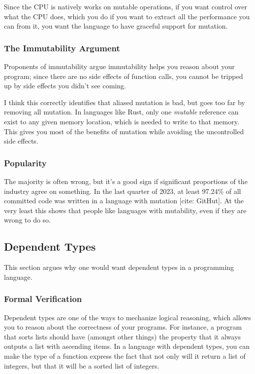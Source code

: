 \documentclass[12pt,twoside]{report}
\begin{document}
Since the CPU is natively works on mutable operations, if you want control over what the CPU does, which you do if you want to extract all the performance you can from it, you want the language to have graceful support for mutation.

\subsubsection{The Immutability Argument}
Proponents of immutability argue immutability helps you reason about your program; since there are no side effects of function calls, you cannot be tripped up by side effects you didn't see coming.

I think this correctly identifies that aliased mutation is bad, but goes too far by removing all mutation. In languages like Rust, only one \textit{mutable} reference can exist to any given memory location, which is needed to write to that memory. This gives you most of the benefits of mutation while avoiding the uncontrolled side effects.

\subsubsection{Popularity}
The majority is often wrong, but it's a good sign if significant proportions of the industry agree on something. In the last quarter of 2023, at least 97.24\% of all committed code was written in a language with mutation [cite: GitHut]. At the very least this shows that people like languages with mutability, even if they are wrong to do so.

\subsection{Dependent Types}
This section argues why one would want dependent types in a programming language.

\subsubsection{Formal Verification}
Dependent types are one of the ways to mechanize logical reasoning, which allows you to reason about the correctness of your programs. For instance, a program that sorts lists should have (amongst other things) the property that it always outputs a list with ascending items. In a language with dependent types, you can make the type of a function express the fact that not only will it return a list of integers, but that it will be a sorted list of integers.
\end{document}
